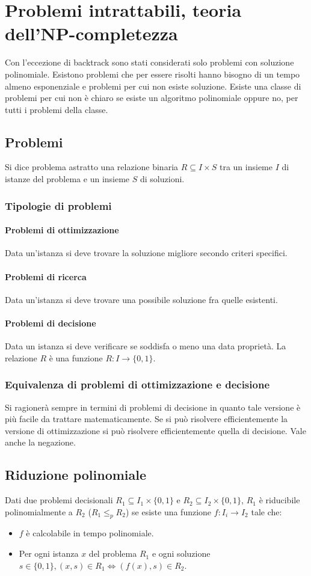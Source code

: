\chapter{Problemi intrattabili, teoria dell'NP-completezza}
Con l'eccezione di backtrack sono stati considerati solo problemi con soluzione polinomiale. Esistono problemi che per essere risolti hanno bisogno di un tempo almeno esponenziale e 
problemi per cui non esiste soluzione. Esiste una classe di problemi per cui non \`e chiaro se esiste un algoritmo polinomiale oppure no, per tutti i problemi della classe.
\section{Problemi}
Si dice problema astratto una relazione binaria $R\subseteq I\times S$ tra un insieme $I$ di istanze del problema e un insieme $S$ di soluzioni.
\subsection{Tipologie di problemi}
\subsubsection{Problemi di ottimizzazione}
Data un'istanza si deve trovare la soluzione migliore secondo criteri specifici.
\subsubsection{Problemi di ricerca}
Data un'istanza si deve trovare una possibile soluzione fra quelle esistenti.
\subsubsection{Problemi di decisione}
Data un istanza si deve verificare se soddisfa o meno una data propriet\`a. La relazione $R$ \`e una funzione $R:I\rightarrow\{0, 1\}$.	
\subsection{Equivalenza di problemi di ottimizzazione e decisione}
Si ragioner\`a sempre in termini di problemi di decisione in quanto tale versione \`e pi\`u facile da trattare matematicamente. Se si pu\`o risolvere efficientemente la versione
di ottimizzazione si pu\`o risolvere efficientemente quella di decisione. Vale anche la negazione. 
\section{Riduzione polinomiale}
Dati due problemi decisionali $R_1\subseteq I_1\times\{0, 1\}$ e $R_2\subseteq I_2\times\{0, 1\}$, $R_1$ \`e riducibile polinomialmente a $R_2$ ($R_1\le_p R_2$) se esiste una funzione
$f:I_i\rightarrow I_2$ tale che:
\begin{itemize}
	\item $f$ \`e calcolabile in tempo polinomiale.
	\item Per ogni istanza $x$ del problema $R_1$ e ogni soluzione $s\in \{0, 1\}, (x, s)\in R_1\Leftrightarrow (f(x), s)\in R_2$.
\end{itemize}
